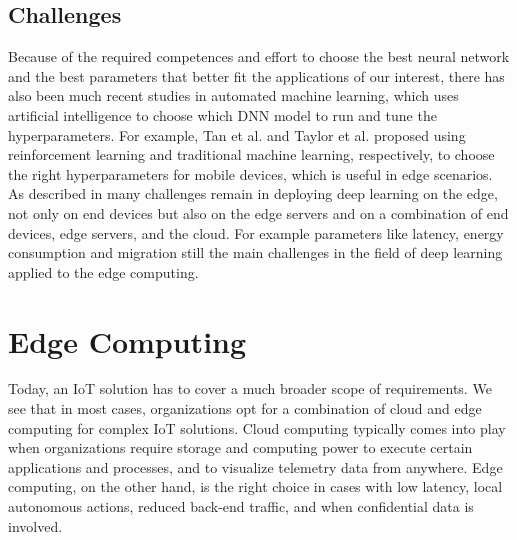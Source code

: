 \subsection{Challenges}
Because of the required competences and effort to choose the best neural network and the best parameters that better fit the applications of our interest, there has also been much recent studies in automated machine learning, which uses artificial intelligence to choose which DNN model to run and tune the hyperparameters. 
For example, Tan et al. \cite{tan2018mnasnet} and Taylor et al. \cite{taylor2018adaptive} proposed using reinforcement learning and traditional machine learning, respectively, to choose the right hyperparameters for mobile devices, which is useful in edge scenarios.
As described in \cite{deepedgerev} many challenges remain in deploying deep learning on the edge, not only on end devices but also on the edge servers and on a combination of end devices, edge servers, and the cloud. For example parameters like latency, energy consumption and migration still the main challenges in the field of deep learning applied to the edge computing.



\section{Edge Computing} %
Today, an IoT solution has to cover a much broader scope of requirements. We see that in most cases, organizations opt for a combination of cloud and edge computing for complex IoT solutions. Cloud computing typically comes into play when organizations require storage and computing power to execute certain applications and processes, and to visualize telemetry data from anywhere. Edge computing, on the other hand, is the right choice in cases with low latency, local autonomous actions, reduced back-end traffic, and when confidential data is involved.

